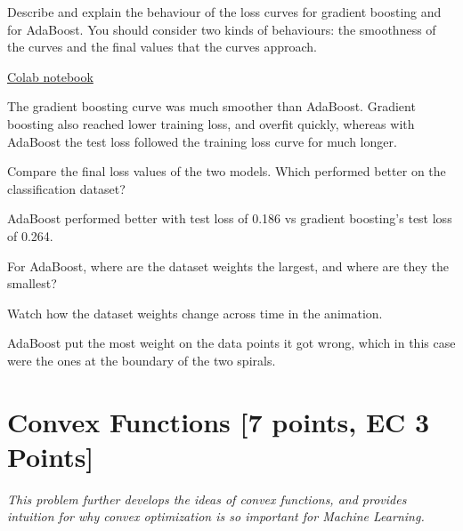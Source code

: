 \begin{problem}[2]
    Describe and explain the behaviour of the loss curves for gradient boosting and for AdaBoost. You should consider two kinds of behaviours: the smoothness of the curves and the final values that the curves approach.
\end{problem}

\pagebreak

\begin{solution}
    \href{https://colab.research.google.com/drive/1BGnwB-zCiHJNvN4Ay0QlmWGJJF420Vl6?usp=sharing}{Colab notebook}

    The gradient boosting curve was much smoother than AdaBoost.
    Gradient boosting also reached lower training loss, and overfit quickly, whereas with AdaBoost the test loss followed the training loss curve for much longer.
\end{solution}

\begin{problem}[2]
    Compare the final loss values of the two models. Which performed better on the classification dataset?
\end{problem}

\begin{solution}
    AdaBoost performed better with test loss of 0.186 vs gradient boosting's test loss of 0.264.
\end{solution}

\begin{problem}[2]
    For AdaBoost, where are the dataset weights the largest, and where are they the smallest?
\end{problem}
\begin{hint}
    Watch how the dataset weights change across time in the animation.
\end{hint}
\begin{solution}
    AdaBoost put the most weight on the data points it got wrong, which in this case were the ones at the boundary of the two spirals.
\end{solution}

\newpage
\section{Convex Functions [7 points, EC 3 Points]}

\emph{This problem further develops the ideas of convex functions, and provides intuition for why convex optimization is so important for
 Machine Learning.}

